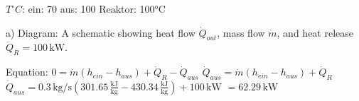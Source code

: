 \( T^\circ C \):  
ein: 70  
aus: 100  
Reaktor: 100°C  

a)  
Diagram: A schematic showing heat flow \( \dot{Q}_{out} \), mass flow \( \dot{m} \), and heat release \( \dot{Q}_R = 100 \, \text{kW} \).  

Equation:  
\( 0 = \dot{m} (h_{ein} - h_{aus}) + \dot{Q}_R - \dot{Q}_{aus} \)  
\( \dot{Q}_{aus} = \dot{m} (h_{ein} - h_{aus}) + \dot{Q}_R \)  
\( \dot{Q}_{aus} = 0.3 \, \text{kg/s} \left( 301.65 \, \frac{\text{kJ}}{\text{kg}} - 430.34 \, \frac{\text{kJ}}{\text{kg}} \right) + 100 \, \text{kW} \)  
\( = 62.29 \, \text{kW} \)